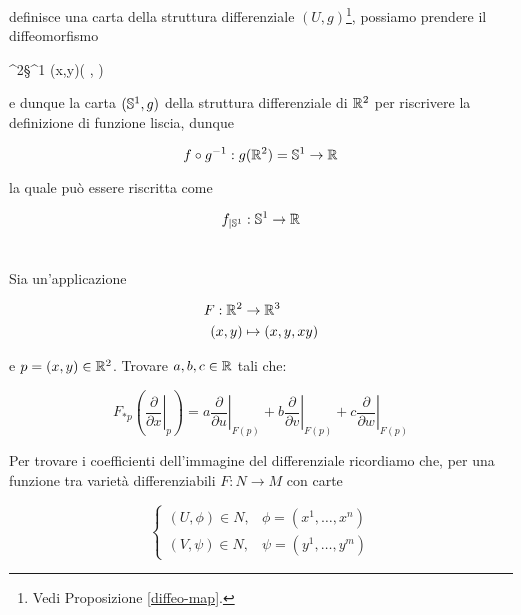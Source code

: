 definisce una carta della struttura differenziale $ (U,g) $\footnote{%
	Vedi Proposizione \ref{diffeo-map}.%
}, possiamo prendere il diffeomorfismo

%
	{\R^{2}}{\S^{1}}%
	{(x,y)}{\left( , \right)}
	
e dunque la carta $ (\S^{1},g) $ della struttura differenziale di $ \R^{2} $ per riscrivere la definizione di funzione liscia, dunque

\begin{equation}
	f \circ g^{-1} : g(\R^{2}) = \S^{1} \to \R
\end{equation}

la quale può essere riscritta come

\begin{equation}
	f_{|\S^{1}} : \S^{1} \to \R
\end{equation}

\tocless\section{}\label{es2-8}

\begin{tcolorbox}
	Sia un'applicazione
	
	\begin{align}
		\begin{split}
			F : \R^{2} &\to \R^{3}\\
			(x,y) &\mapsto (x,y,xy)
		\end{split}
	\end{align}
	
	e $ p = (x,y) \in \R^{2} $. Trovare $ a,b,c \in \R $ tali che:
	
	\begin{equation}
		F_{*p} \left( \left. \dfrac{\partial}{\partial x} \right|_{p} \right) = a \left. \dfrac{\partial}{\partial u} \right|_{F(p)} + b \left. \dfrac{\partial}{\partial v} \right|_{F(p)} + c \left. \dfrac{\partial}{\partial w} \right|_{F(p)}
	\end{equation}
\end{tcolorbox}

Per trovare i coefficienti dell'immagine del differenziale ricordiamo che, per una funzione tra varietà differenziabili $ F : N \to M $ con carte

\begin{equation}
	\begin{cases}
		(U,\phi) \in N, & \phi = (x^{1},\dots,x^{n})\\
		(V,\psi) \in N, & \psi = (y^{1},\dots,y^{m})
	\end{cases}
\end{equation}

